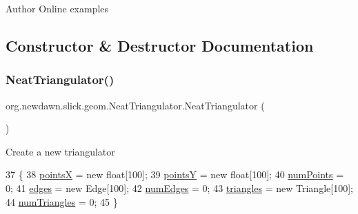 \begin{DoxyAuthor}{Author}
Online examples 
\end{DoxyAuthor}


\subsection{Constructor \& Destructor Documentation}
\mbox{\label{classorg_1_1newdawn_1_1slick_1_1geom_1_1_neat_triangulator_aa62b863de4b884975e744a452dd2f280}} 
\subsubsection{\texorpdfstring{Neat\+Triangulator()}{NeatTriangulator()}}
{\footnotesize\ttfamily org.\+newdawn.\+slick.\+geom.\+Neat\+Triangulator.\+Neat\+Triangulator (\begin{DoxyParamCaption}{ }\end{DoxyParamCaption})\hspace{0.3cm}{\ttfamily [inline]}}

Create a new triangulator 
\begin{DoxyCode}
37     \{
38         \mbox{\hyperlink{classorg_1_1newdawn_1_1slick_1_1geom_1_1_neat_triangulator_a651e2f489c027306dacf8b03fb0f04a0}{pointsX}} = \textcolor{keyword}{new} \textcolor{keywordtype}{float}[100];
39         \mbox{\hyperlink{classorg_1_1newdawn_1_1slick_1_1geom_1_1_neat_triangulator_ac4491217b5be9c7a1ccbdb5511f832d9}{pointsY}} = \textcolor{keyword}{new} \textcolor{keywordtype}{float}[100];
40         \mbox{\hyperlink{classorg_1_1newdawn_1_1slick_1_1geom_1_1_neat_triangulator_a24b4a230bc11d3c96dfe1de4dcb297f5}{numPoints}} = 0;
41         \mbox{\hyperlink{classorg_1_1newdawn_1_1slick_1_1geom_1_1_neat_triangulator_a0abf260e1febb5ef0afc9894280f9efb}{edges}} = \textcolor{keyword}{new} Edge[100];
42         \mbox{\hyperlink{classorg_1_1newdawn_1_1slick_1_1geom_1_1_neat_triangulator_a4c9fba4faad072774b3b0fcbc7fd0fff}{numEdges}} = 0;
43         \mbox{\hyperlink{classorg_1_1newdawn_1_1slick_1_1geom_1_1_neat_triangulator_a007f9ede3582ce3c9c1439b40e4e5f55}{triangles}} = \textcolor{keyword}{new} Triangle[100];
44         \mbox{\hyperlink{classorg_1_1newdawn_1_1slick_1_1geom_1_1_neat_triangulator_a5a9d015e9872ed5961cddfb49b3d1853}{numTriangles}} = 0;
45     \}
\end{DoxyCode}



